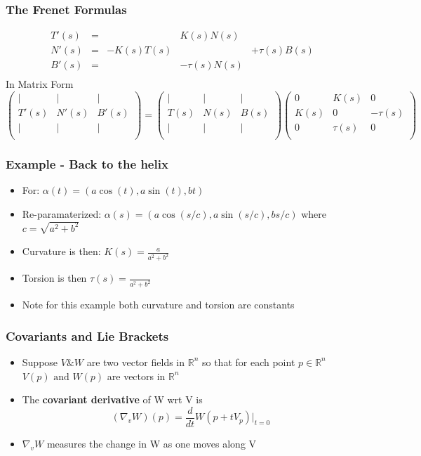\documentclass[10pt]{beamer}
\newcommand{\myemph}[1]{{\usebeamercolor[fg]{emphprimary}
    \textbf{#1}}}
\begin{document}
\begin{frame}
  \frametitle{The Frenet Formulas}
  \[
    \begin{array}{rclll}
      T'(s)   &=& & K(s) N(s )& \\
      N'(s)   &=&-K(s) T(s) && + \tau(s) B(s)\\
      B'(s)   & =& & -\tau(s) N(s) \\
    \end{array}
  \]
  In Matrix Form
  \[
    \left(
      \begin{array}{ccc}
        | & | & | \\
        T'(s) & N'(s) & B'(s)\\
        | & | & | \\
      \end{array}
    \right) =
    \left(
      \begin{array}{ccc}
        | & | & | \\
        T(s) & N(s) & B(s)\\
        | & | & | \\
      \end{array}
    \right)
    \left(
      \begin{array}{ccc}
        0 & K(s)& 0 \\
        K(s) & 0 & -\tau(s)\\
        0  & \tau(s) & 0\\
      \end{array}
    \right)
  \]
\end{frame}

\begin{frame}
  \frametitle{Example - Back to the helix}
  \begin{itemize}
  \item For: $\alpha(t) = (a \cos(t), a \sin(t), bt)$
  \item Re-paramaterized: $\alpha(s) = (a \cos(s/c), a \sin(s/c), b s/c)$ where $c = \sqrt{a^2 + b^2}$
  \item Curvature is then: $K(s) = \frac{a}{a^2+b^2}$
  \item Torsion is then $\tau(s) = \frac{}{a^2+b^2}$
  \item Note for this example both curvature and torsion are constants
  \end{itemize}
\end{frame}

\begin{frame}
  \frametitle{Covariants and Lie Brackets}
  \begin{itemize}
  \item Suppose $V \& W$ are two vector fields in $\mathbb{R}^n$ so
    that for each point $p \in \mathbb{R}^n$ $V(p) \mbox{ and } W(p)$
    are vectors in $\mathbb{R}^n$
  \item The \myemph{covariant derivative} of W wrt V is
    \[
      (\nabla_v W)(p) = \frac{d}{dt} W(p + t V_p)|_{t = 0}
    \]
  \item $\nabla_v W$ measures the change in W as one moves along V
  \end{itemize}
\end{frame}
\end{document}
